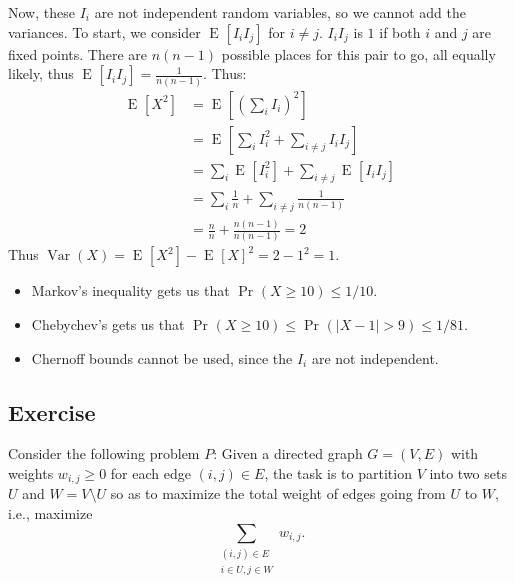\documentclass[14pt]{extreport}
\newcounter{counter}
\newcommand{\Exercise}{Exercise \stepcounter{counter}\thecounter}
\newcommand{\Var}[1]{\operatorname{Var}\left(#1\right)}
\newcommand{\E}[2][]{\operatorname{E}_{#1}\left[#2\right]}
\renewcommand{\Pr}[2][]{\operatorname{Pr}_{#1}\left(#2\right)}
\begin{document}
    \vspace{3mm}
    Now, these $I_i$ are not independent random variables, so we cannot add the variances. To start, we consider $\E{I_iI_j}$ for $i \neq j$. $I_iI_j$ is $1$ if both $i$ and $j$ are fixed points. There are $n(n-1)$ possible places for this pair to go, all equally likely, thus $\E{I_iI_j} = \frac{1}{n(n-1)}$. Thus:
    \begin{align*}
        \E{X^2} &= \E{\left(\sum_i I_i\right)^2}\\
        &= \E{\sum_i I_i^2 + \sum_{i\neq j} I_iI_j}\tag{By expanding the square}\\
        &= \sum_i \E{I_i^2} + \sum_{i\neq j} \E{I_iI_j} \tag{By Linearity of
        Expectation}\\
        &= \sum_i \frac1n + \sum_{i\neq j} \frac{1}{n(n-1)} \\
        &= \frac{n}{n} + \frac{n(n-1)}{n(n-1)} = 2
    \end{align*}
    Thus $\Var{X} = \E{X^2} - \E{X}^2 = 2-1^2 = 1$.
    \begin{itemize}[label={\textbf{--}}]
        \item Markov's inequality gets us that $\Pr{X \geq 10} \leq 1/10$.
        \item Chebychev's gets us that $\Pr{X \geq 10} \leq \Pr{|X - 1| > 9} \leq 1/81$.
        \item Chernoff bounds cannot be used, since the $I_i$ are not independent.
    \end{itemize}

\subsection*{\Exercise}
    Consider the following problem \( P \): Given a directed graph \( G = (V, E) \) with weights \( w_{i,j} \geq 0 \) for each edge \( (i, j) \in E \), the task is to partition \( V \) into two sets \( U \) and \( W = V \setminus U \) so as to maximize the total weight of edges going from \( U \) to \( W \), i.e., maximize
    \[
    \sum_{\substack{(i,j) \in E \\ i \in U,j \in W}} w_{i,j}.
    \]
    
\end{document}
